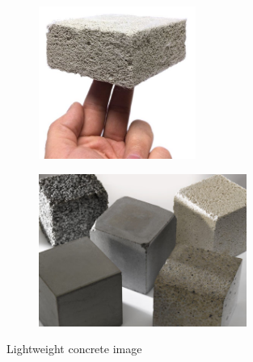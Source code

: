 \documentclass[aspectratio=169]{beamer}
\begin{document}
\begin{frame}{}
\begin{figure}[h]
\begin{columns}
    \column{\dimexpr\paperwidth-10pt} 
  \end{columns}
\begin{subfigure}{0.45\textwidth}
\includegraphics[width=0.9\linewidth, height=5cm]{concrete.jpg} 
\caption{}
\label{fig:subim1}
 
\end{subfigure}
\begin{subfigure}{0.5\textwidth}
\includegraphics[width=0.9\linewidth, height=5cm]{lightweight-concrete.jpg}
\caption{}
\label{fig:subim2}
\end{subfigure}

\caption{Lightweight concrete image}
\label{fig:image2}

\end{figure}
\end{frame}
  
\end{document}
